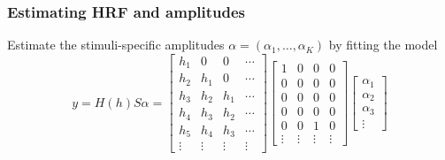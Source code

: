 \documentclass{beamer}
\begin{document}
\begin{frame}
\frametitle{Estimating HRF and amplitudes}

Estimate the stimuli-specific amplitudes $\alpha = (\alpha_1,\hdots,\alpha_K)$ by fitting the model
\[
y = H(h) S \alpha = \begin{bmatrix}
h_1 & 0 & 0 & \cdots\\
h_2 & h_1 & 0 & \cdots\\
h_3 & h_2 & h_1 & \cdots\\
h_4 & h_3 & h_2 & \cdots\\
h_5 & h_4 & h_3 & \cdots\\
\vdots & \vdots & \vdots & \vdots
\end{bmatrix}
\begin{bmatrix}
1 & 0 & 0 & 0\\
0 & 0 & 0 & 0\\
0 & 0 & 0 & 0\\
0 & 0 & 0 & 0\\
0 & 0 & 1 & 0\\
\vdots & \vdots & \vdots & \vdots
\end{bmatrix}
\begin{bmatrix}
\alpha_1\\\alpha_2\\\alpha_3\\\vdots
\end{bmatrix}
\]

\end{frame}
\end{document}
